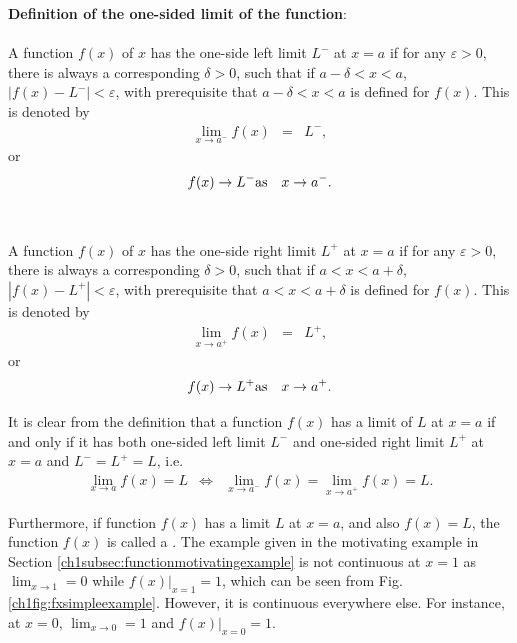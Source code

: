 \begin{mdframed}
\textbf{Definition of the one-sided limit of the function}:
\\
\\
\noindent A function $f(x)$ of $x$ has the one-side left limit $L^-$ at $x=a$ if for any $\varepsilon > 0$, there is always a corresponding $\delta > 0$, such that if $a-\delta<x<a$, $|f(x)-L^-| < \varepsilon$, with prerequisite that $a-\delta<x<a$ is defined for $f(x)$. This is denoted by
\begin{eqnarray}
   \lim_{x\rightarrow a^-} f(x) &=& L^-, \nonumber
\end{eqnarray}
or
\begin{eqnarray}
  f(x) \rightarrow L^- & \textup{as} & x \rightarrow a^-. \nonumber
\end{eqnarray}
\\
\\
\noindent A function $f(x)$ of $x$ has the one-side right limit $L^+$ at $x=a$ if for any $\varepsilon > 0$, there is always a corresponding $\delta > 0$, such that if $a<x<a+\delta$, $|f(x)-L^+| < \varepsilon$, with prerequisite that $a<x<a+\delta$ is defined for $f(x)$. This is denoted by
\begin{eqnarray}
   \lim_{x\rightarrow a^+} f(x) &=& L^+, \nonumber
\end{eqnarray}
or
\begin{eqnarray}
  f(x) \rightarrow L^+ & \textup{as} & x \rightarrow a^+. \nonumber
\end{eqnarray}
\end{mdframed}

It is clear from the definition that a function $f(x)$ has a limit of $L$ at $x=a$ if and only if it has both one-sided left limit $L^-$ and one-sided right limit $L^+$ at $x=a$ and $L^-=L^+=L$, i.e.
\begin{eqnarray}
  \lim_{x\rightarrow a}f(x)=L &\Leftrightarrow& \lim_{x\rightarrow a^-}f(x) = \lim_{x\rightarrow a^+}f(x) = L. \nonumber
\end{eqnarray}

Furthermore, if function $f(x)$ has a limit $L$ at $x=a$, and also $f(x)=L$, the function $f(x)$ is called a . The example given in the motivating example in Section \ref{ch1subsec:functionmotivatingexample} is not continuous at $x=1$ as $\lim_{x\rightarrow 1}=0$ while $\left.f(x)\right|_{x=1}=1$, which can be seen from Fig. \ref{ch1fig:fxsimpleexample}. However, it is continuous everywhere else. For instance, at $x=0$, $\lim_{x\rightarrow 0}=1$ and $\left.f(x)\right|_{x=0}=1$.

